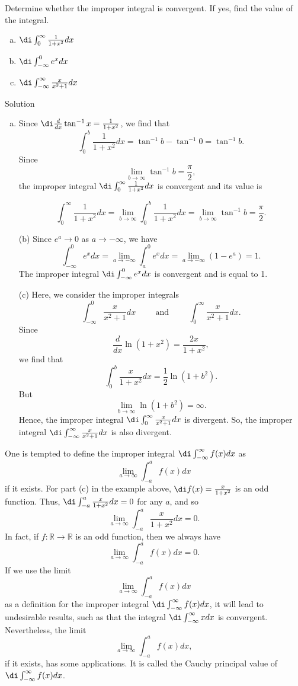 \begin{example}[label=20230527]{}
\begin{example}{}
Determine whether the improper integral  is convergent. If yes, find the value of the integral.
\begin{enumerate}[(a)]
\item 
$\di \int_0^{\infty}\frac{1}{1+x^2}dx$
\item $\di \int_{-\infty}^0e^{x}dx$
\item $\di\int_{-\infty}^{\infty}\frac{x}{x^2+1}dx$
\end{enumerate}
\end{example}
\begin{solution}{Solution}
\begin{enumerate}[(a)]
\item
Since $\di\frac{d}{dx}\tan^{-1}x=\frac{1}{1+x^2}$, we find that
\[\int_0^b \frac{1}{1+x^2}dx=\tan^{-1}b-\tan^{-1}0=\tan^{-1}b.\]
Since
\[\lim_{b\to\infty}\tan^{-1}b=\frac{\pi}{2},\]the improper integral $\di \int_0^{\infty}\frac{1}{1+x^2}dx$ is convergent and its value is \end{enumerate}\bs\begin{enumerate}[(a)]\item[]
\[ \int_0^{\infty}\frac{1}{1+x^2}dx=\lim_{b\to\infty} \int_0^b \frac{1}{1+x^2}dx =\lim_{b\to\infty} \tan^{-1}b=\frac{\pi}{2}.\]
\item[(b)] Since $e^a\to 0$ as $a\to-\infty$, we have
\[ \int_{-\infty}^0e^{x}dx=\lim_{a\to -\infty}\int_a^{0}e^xdx=\lim_{a\to-\infty}\left(1-e^a\right)=1.\]The improper integral  $\di \int_{-\infty}^0e^{x}dx$ is convergent and is equal to 1.
\item[(c)] Here, we consider the improper integrals
\[\int_{-\infty}^0\frac{x}{x^2+1}dx\hspace{1cm}\text{and}\hspace{1cm}\int_0^{\infty} \frac{x}{x^2+1}dx.\]
Since
\[\frac{d}{dx}\ln(1+x^2)=\frac{2x}{1+x^2},\]we find that
\[\int_0^b\frac{x}{1+x^2}dx=\frac{1}{2}\ln(1+b^2).\]
But \[\lim_{b\to\infty}\ln(1+b^2)=\infty.\]
Hence,
 the improper integral $\di\int^{\infty}_0\frac{x}{x^2+1}dx$ is divergent. So, the improper integral  $\di\int_{-\infty}^{\infty}\frac{x}{x^2+1}dx$ is also divergent.
\end{enumerate}
\end{solution}
One is tempted to  
define the improper integral  
$\di\int_{-\infty}^{\infty}f(x)dx$  as
\[\lim_{a\to \infty}\int_{-a}^af(x)dx\] if it exists. For part (c) in the example above, $\di f(x)=\frac{x}{1+x^2}$ is an odd function. Thus, $\di \int_{-a}^a\frac{x}{1+x^2}dx=0$ for any $a$, and so
\[\lim_{a\to \infty}\int_{-a}^a\frac{x}{1+x^2}dx=0.\]
In fact, if $f:\mathbb{R}\to\mathbb{R}$ is an odd function, then we always have
\[\lim_{a\to \infty}\int_{-a}^af(x)dx=0.\]If we use   the limit \[\lim_{a\to \infty}\int_{-a}^af(x)dx\] as a definition for the improper integral $\di\int_{-\infty}^{\infty}f(x)dx$, it will lead to  undesirable results, such as that the integral $\di \int_{-\infty}^{\infty} xdx$ is convergent. Nevertheless,  the limit \[\lim_{a\to \infty}\int_{-a}^af(x)dx,\] if it exists, has some applications. It is called the Cauchy principal value of $\di\int_{-\infty}^{\infty}f(x)dx$.



\end{example}
